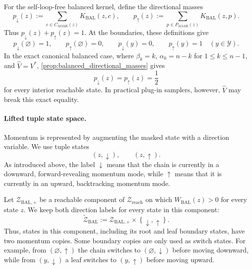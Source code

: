 \documentclass{article}
\numberwithin{theorem}{section}
\numberwithin{proposition}{section}
\numberwithin{corollary}{section}
\numberwithin{lemma}{section}
\numberwithin{conjecture}{section}
\numberwithin{remark}{section}
\numberwithin{definition}{section}
\numberwithin{assumption}{section}
\numberwithin{example}{section}
\newcommand{\calY}{{\mathcal{Y}}}
\newcommand{\calZ}{{\mathcal{Z}}}
\newcommand{\mbra}[1]{\left\{#1\right\}}
\begin{document}
For the self-loop-free balanced kernel, define the directional masses
\begin{equation*}
    p_{\downarrow}(z) := \sum_{c\in C_{\mathrm{AOAR}}(z)}K_{\mathrm{BAL}}(z,c), \qquad
    p_{\uparrow}(z) := \sum_{p\in P_{\mathrm{AOAR}}(z)}K_{\mathrm{BAL}}(z,p).
\end{equation*}
Thus $p_{\downarrow}(z)+p_{\uparrow}(z)=1$. At the boundaries, these definitions give
\begin{equation*}
    p_{\downarrow}(\varnothing)=1,\qquad p_{\uparrow}(\varnothing)=0,\qquad
    p_{\downarrow}(y)=0,\qquad p_{\uparrow}(y)=1\quad (y\in\calY).
\end{equation*}
In the exact canonical balanced case, where $\beta_k=k$, $\alpha_k=n-k$ for $1\le k\le n-1$, and $\widehat V=V^*$, \cref{prop:balanced_directional_masses} gives
\begin{equation*}
    p_{\downarrow}(z)=p_{\uparrow}(z)=\frac12
\end{equation*}
for every interior reachable state. In practical plug-in samplers, however, $\widehat V$ may break this exact equality.

\paragraph{Lifted tuple state space.}
Momentum is represented by augmenting the masked state with a direction variable. We use tuple states
\begin{equation*}
    (z,\downarrow), \qquad (z,\uparrow).
\end{equation*}
As introduced above, the label $\downarrow$ means that the chain is currently in a downward, forward-revealing momentum mode, while $\uparrow$ means that it is currently in an upward, backtracking momentum mode.

Let $\calZ_{\mathrm{BAL},+}$ be a reachable component of $\calZ_{\mathrm{reach}}$ on which $W_{\mathrm{BAL}}(z)>0$ for every state $z$. We keep both direction labels for every state in this component:
\begin{equation*}
    \widetilde{\calZ}_{\mathrm{BAL}} := \calZ_{\mathrm{BAL},+}\times\mbra{\downarrow,\uparrow}.
\end{equation*}
Thus, states in this component, including its root and leaf boundary states, have two momentum copies. Some boundary copies are only used as switch states. For example, from $(\varnothing,\uparrow)$ the chain switches to $(\varnothing,\downarrow)$ before moving downward, while from $(y,\downarrow)$ a leaf switches to $(y,\uparrow)$ before moving upward.
\end{document}
